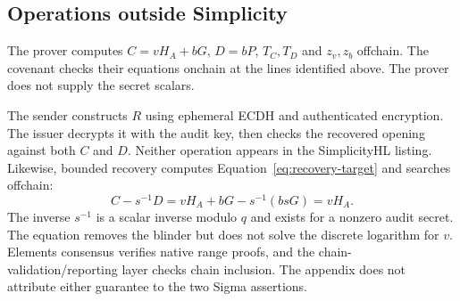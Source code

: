 
\begin{auditmapping}
\end{auditmapping}

\subsection{Operations outside Simplicity}

The prover computes $C=vH_A+bG$, $D=bP$, $T_C,T_D$ and $z_v,z_b$ offchain.
The covenant checks their equations onchain at the lines identified above. The prover does not supply the secret scalars.

The sender constructs $R$ using ephemeral ECDH and authenticated encryption.
The issuer decrypts it with the audit key, then checks the recovered opening against both $C$ and $D$.
Neither operation appears in the SimplicityHL listing.
Likewise, bounded recovery computes Equation~\ref{eq:recovery-target} and searches offchain:
\[
  C-s^{-1}D
  =vH_A+bG-s^{-1}(bsG)
  =vH_A.
\]
The inverse $s^{-1}$ is a scalar inverse modulo $q$ and exists for a nonzero audit secret.
The equation removes the blinder but does not solve the discrete logarithm for $v$.
Elements consensus verifies native range proofs, and the chain-validation/reporting layer checks chain inclusion.
The appendix does not attribute either guarantee to the two Sigma assertions.
